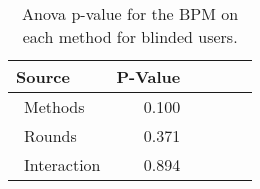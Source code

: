
\begin{table}[!htb]
\centering
\caption{Anova p-value for the BPM on each method for blinded users.}
\label{tab:blocanova_bpm_two_way_blind}
\begin{tabular}{lrrrrr}
\toprule
          Source & P-Value \\
\midrule
    \    Methods &   0.100 \\
     \    Rounds &   0.371 \\
\    Interaction &   0.894 \\
\bottomrule
\end{tabular}
\end{table}

